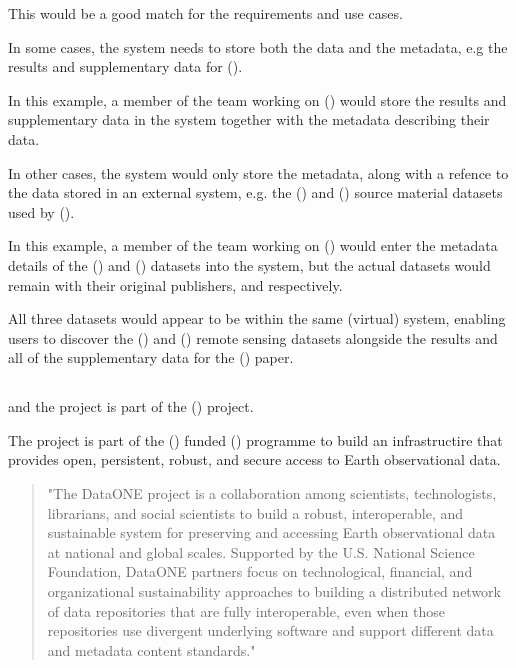 \documentclass{article}
\begin{document}
This would be a good match for the \cite{trop} requirements and use cases.

In some cases, the \cite{trop} system needs to store both the data and the
metadata, e.g the results and supplementary data for (\cite{mitchard-2014}).

In this example, a member of the team working on (\cite{mitchard-2014})
would store the results and supplementary data in the \cite{trop} system
together with the metadata describing their data.

In other cases, the \cite{trop} system would only store the metadata,
along with a refence to the data stored in an external system, e.g. the
(\cite{saatchi-2011}) and (\cite{baccini-2012}) source material datasets
used by (\cite{mitchard-2014}).

In this example, a member of the team working on (\cite{mitchard-2014})
would enter the metadata details of the (\cite{saatchi-2011}) and
(\cite{baccini-2012}) datasets into the \cite{trop} system, but
the actual datasets would remain with their original publishers,
 and  respectively.

All three datasets would appear to be within the same (virtual)
system, enabling \cite{trop} users to discover the (\cite{saatchi-2011})
and (\cite{baccini-2012}) remote sensing datasets alongside the results
and all of the supplementary data for the (\cite{mitchard-2014}) paper.

\subsection{}

\cite{metacat} and the \cite{knb} project is part of the  (\cite{data-one})
project.

The \cite{data-one} project is part of the  (\cite{nsf})
funded  (\cite{data-net}) programme to build an
infrastructire that provides open, persistent, robust, and secure access
to Earth observational data.
 
\begin{quote}
"The DataONE project is a collaboration among scientists, technologists,
librarians, and social scientists to build a robust, interoperable,
and sustainable system for preserving and accessing Earth observational
data at national and global scales. Supported by the U.S. National
Science Foundation, DataONE partners focus on technological, financial,
and organizational sustainability approaches to building a distributed
network of data repositories that are fully interoperable, even when those
repositories use divergent underlying software and support different data
and metadata content standards."
\end{quote}
\end{document}
